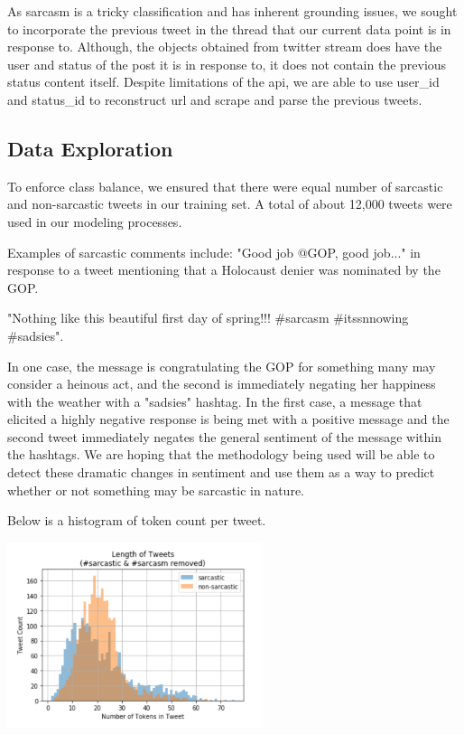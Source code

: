 \documentclass[11pt,a4paper]{article}
\begin{document}
As sarcasm is a tricky classification and has inherent grounding issues, we sought to incorporate the previous tweet in the thread that our current data point is in response to.   Although, the objects obtained from twitter stream does have the user and status of the post it is in response to, it does not contain the previous status content itself.  Despite limitations of the api, we are able to use user\_id and status\_id to reconstruct url and scrape and parse the previous tweets. 

\subsection{Data Exploration}
To enforce class balance, we ensured that there were equal number of sarcastic and non-sarcastic tweets in our training set. A total of about 12,000 tweets were used in our modeling processes.

Examples of sarcastic comments include:
 "Good job @GOP, good job..." in response to a tweet mentioning that a Holocaust denier was nominated by the GOP.   
 
 "Nothing like this beautiful first day of spring!!! \#sarcasm \#itssnnowing \#sadsies". 
 
 In one case, the message is congratulating the GOP for something many may consider a heinous act, and the second is immediately negating her happiness with the weather with a "sadsies" hashtag. In the first case, a message that elicited a highly negative response is being met with a positive message and the second tweet immediately negates the general sentiment of the message within the hashtags. We are hoping that the methodology being used will be able to detect these dramatic changes in sentiment and use them as a way to predict whether or not something may be sarcastic in nature.

Below is a histogram of token count per tweet.

\includegraphics[width=75mm,scale=0.5]{token_histogram.png}
\end{document}
